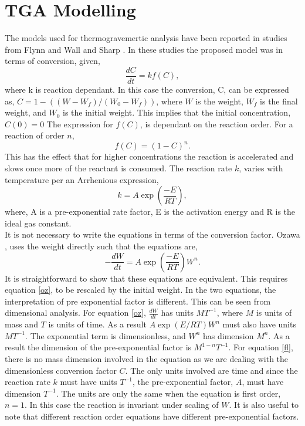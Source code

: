 \section{TGA Modelling}
The models used for thermogravemertic analysis have been reported in studies from Flynn and Wall \cite{flynn66} and Sharp \cite{sharp69}. In these studies the proposed model was in terms of conversion, given,
\begin{equation}
\frac{dC}{dt}=kf(C), \label{fl}
\end{equation}
where k is reaction dependant. In this case the conversion, C, can be expressed as, $C=1-\left(\left(W-W_f\right)/\left(W_0-W_f\right)\right)$, where $W$ is the weight, $W_f$ is the final weight, and $W_0$ is the initial weight. This implies that the initial concentration, $C(0)=0$ The expression for $f(C)$, is dependant on the reaction order. For a reaction of order $n$,
\begin{equation}
f(C)=(1-C)^n.
\end{equation}
This has the effect that for higher concentrations the reaction is accelerated and slows once more of the reactant is consumed. The reaction rate $k$, varies with temperature per an Arrhenious expression, \\
\begin{equation}
k=A\exp\left(\frac{-E}{RT}\right),
\end{equation}
where, A is a pre-exponential rate factor, E is the activation energy and R is the ideal gas constant.\\
It is not necessary to write the equations in terms of the conversion factor. Ozawa \cite{ozawa65}, uses the weight directly such that the equations are,
\begin{equation}
-\frac{dW}{dt}=A\exp\left(\frac{-E}{RT}\right) W^n. \label{oz}
\end{equation} 
It is straightforward to show that these equations are equivalent. This requires equation \eqref{oz}, to be rescaled by the initial weight. In the two equations, the interpretation of pre exponential factor is different. This can be seen from dimensional analysis. For equation \eqref{oz}, $\frac{dW}{dt}$ has units $MT^{-1}$, where $M$ is units of mass and $T$ is units of time. As a result $A\exp(E/RT)W^n$ must also have units $MT^{-1}$. The exponential term is dimensionless, and $W^n$ has dimension $M^n$. As a result the dimension of the pre-exponential factor is $M^{1-n}T^{-1}$. For equation \eqref{fl}, there is no mass dimension involved in the equation as we are dealing with the dimensionless conversion factor $C$. The only units involved are time and since the reaction rate $k$ must have units $T^{-1}$, the pre-exponential factor, $A$, must have dimension $T^{-1}$. The units are only the same when the equation is first order, $n=1$. In this case the reaction is invariant under scaling of $W$. It is also useful to note that different reaction order equations have different pre-exponential factors.

